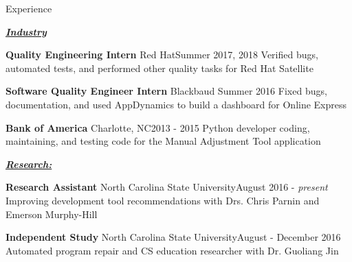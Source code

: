 \documentclass{resume} %
\begin{document}

\begin{rSection}{Experience}
\vspace{-4pt}

\underline{\textbf{\textit{Industry}}}
\vspace{-7pt}

\begin{eSubsection}{\textbf{Quality Engineering Intern} Red Hat}{Summer 2017, 2018}
{Verified bugs, automated tests, and performed other quality tasks for Red Hat Satellite}
\end{eSubsection}
\vspace{-7pt}

\begin{eSubsection}{\textbf{Software Quality Engineer Intern} Blackbaud }{Summer 2016}
{Fixed bugs, documentation, and used AppDynamics to build a dashboard for Online Express}
\item 
\end{eSubsection}
\vspace{-7pt}

\begin{eSubsection}{\textbf{Bank of America} Charlotte, NC}{2013 - 2015}
{Python developer coding, maintaining, and testing code for the Manual Adjustment Tool application}
\item 
\end{eSubsection}
\vspace{-17pt}

\underline{\textbf{\textit{Research:}}}
\vspace{-7pt}

\begin{eSubsection}{\textbf{Research Assistant} North Carolina State University}{August 2016 - \textit{present}}
{Improving development tool recommendations with Drs. Chris Parnin and Emerson Murphy-Hill}
\end{eSubsection}
\vspace{-7pt}

\begin{eSubsection}{\textbf{Independent Study} North Carolina State University}{August - December 2016}
{Automated program repair and CS education researcher with Dr. Guoliang Jin}
\item 
\end{eSubsection}
\vspace{-7pt}


\end{rSection}
\end{document}
